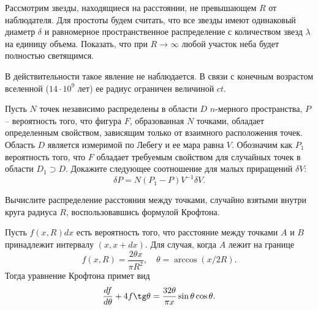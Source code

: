 \begin{problem}
Рассмотрим звезды, находящиеся на расстоянии, не превышающем $R$ от наблюдателя. Для простоты будем считать, что все звезды имеют одинаковый диаметр $\delta$ и равномерное пространственное распределение с количеством звезд $\lambda$ на единицу объема. Показать, что при $R \rightarrow \infty$ любой участок неба будет полностью светящимся.   

\begin{remark}
В действительности такое явление не наблюдается. В связи с конечным возрастом вселенной ($14 \cdot 10^9$ лет) ее радиус ограничен величиной $ct$.
\end{remark}
\end{problem}

\begin{problem}
Пусть  $N$ точек независимо распределены в области $D$ $n$-мерного пространства, $P$ -- вероятность того, что фигура $F$, образованная $N$ точками, обладает определенным свойством,
зависящим только от взаимного расположения точек. Область $D$ является измеримой по Лебегу и ее мара равна $V$. Обозначим как $P_1$ вероятность того, что $F$ обладает требуемым свойством для случайных точек в области $D_1 \supset D$. Докажите следующее соотношение для малых приращений $\delta V$:
 \[
 \delta P = N (P_1 - P) V^{-1} \delta V .
 \]  

\end{problem}

\begin{problem}
Вычислите распределение  расстояния между точками, случайно взятыми внутри круга радиуса $R$, воспользовавшись формулой Крофтона.
\end{problem}
\begin{ordre}
Пусть $f(x,R)dx$ есть вероятность того, что расстояние между точками $A$ и $B$ принадлежит интервалу  $(x, x + dx)$. Для случая, когда $A$ лежит на границе
\[
f(x,R) = \frac{ 2 \theta x}{\pi R^2}, \quad \theta = \arccos (x/2R).
\]
Тогда уравнение Крофтона примет вид
\[
\frac{df}{d\theta} + 4 f \tg \theta = \frac{32 \theta}{\pi x} \sin \theta \cos \theta.
\]
\end{ordre}



